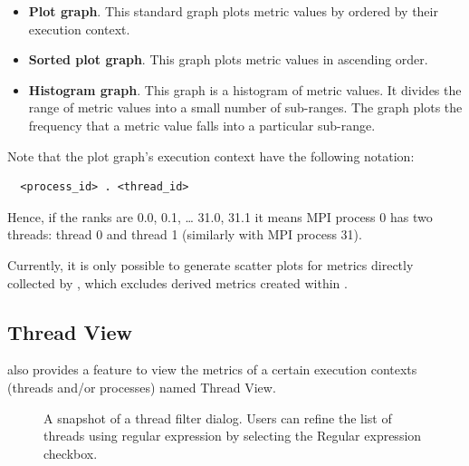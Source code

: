 \begin{itemize}
\item \textbf{Plot graph}.
  This standard graph plots metric values by ordered by their execution context.

\item \textbf{Sorted plot graph}.
  This graph plots metric values in ascending order.

\item \textbf{Histogram graph}.
  This graph is a histogram of metric values.
  It divides the range of metric values into a small number of sub-ranges.
  The graph plots the frequency that a metric value falls into a particular sub-range.
\end{itemize}

Note that the plot graph's execution context have the following notation:
\begin{verbatim}
  <process_id> . <thread_id>
\end{verbatim}
Hence, if the ranks are 0.0, 0.1, \dots{} 31.0, 31.1 it means MPI process 0 has two threads: thread 0 and thread 1 (similarly with MPI process 31).

Currently, it is only possible to generate scatter plots for metrics directly collected by \hpcrun{}, which excludes derived metrics created within \hpcviewer{}.


\subsection{Thread View}
\label{sec:thread-level-table}

\hpcviewer{} also provides a feature to view the metrics of a certain execution contexts (threads and/or processes) named Thread View.

\begin{figure}[t]
\caption{A snapshot of a thread filter dialog. Users can refine the list of threads using regular expression by selecting the Regular expression checkbox.}
\label{fig:hpcviewer-dialog-thread-select}
\end{figure}

